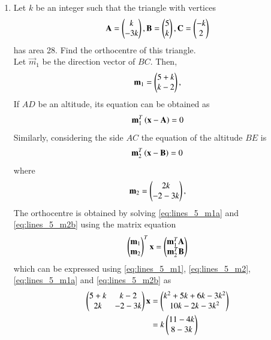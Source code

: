\documentclass[journal,12pt,twocolumn]{IEEEtran}
\begin{document}
\begin{enumerate}[label=\arabic*]
\item Let $k$ be an integer such that the triangle with vertices
\begin{equation}
\label{eq:lines_5}
\mathbf{A} = \begin{pmatrix}k\\-3k\end{pmatrix},
\mathbf{B} =\begin{pmatrix}5\\k\end{pmatrix},
\mathbf{C} =\begin{pmatrix}-k\\2\end{pmatrix}
\end{equation}
has area 28.  Find the orthocentre of this triangle.
%
\\
\solution Let $\vec{m}_1$ be the direction vector of $BC$.  Then,
\begin{align}
\label{eq:lines_5_m1}
\mathbf{m}_1 = \begin{pmatrix}5+k\\k-2\end{pmatrix},
\end{align}
%
If $AD$ be an altitude, its equation can be obtained as
\begin{align}
\label{eq:lines_5_m1a}
\mathbf{m}_1^{T}\left(\mathbf{x}-\mathbf{A}\right) = 0
\end{align}
%
Similarly, considering the side $AC$  the equation of the altitude $BE$ is
\begin{align}
\label{eq:lines_5_m2b}
\mathbf{m}_2^{T}\left(\mathbf{x}-\mathbf{B}\right) = 0
\end{align}
%
where 
\begin{align}
\label{eq:lines_5_m2}
\mathbf{m}_2 = \begin{pmatrix}2k\\-2-3k\end{pmatrix},
\end{align}
The orthocentre is obtained by solving \eqref{eq:lines_5_m1a}
and \eqref{eq:lines_5_m2b} using the matrix equation
\begin{align}
\begin{pmatrix}\mathbf{m}_1\\ \mathbf{m}_2\end{pmatrix}^T \mathbf{x} 
= \begin{pmatrix} \mathbf{m}_1^T\mathbf{A}\\ \mathbf{m}_2^T
\mathbf{B}\end{pmatrix}
\end{align}
%
which can be expressed using \eqref{eq:lines_5_m1}, 
\eqref{eq:lines_5_m2}, 
\eqref{eq:lines_5_m1a} and 
\eqref{eq:lines_5_m2b}
as 
\begin{align}
\begin{pmatrix}5+k & k-2 \\2k & -2-3k\end{pmatrix} \mathbf{x} 
&= \begin{pmatrix} k^2+5k+6k-3k^2\\ 10k-2k-3k^2\end{pmatrix}
\nonumber \\
&= k\begin{pmatrix} 11-4k\\ 8-3k\end{pmatrix}
\label{eq:lines_5_h}
\end{align}
%

\end{enumerate}
\end{document}
